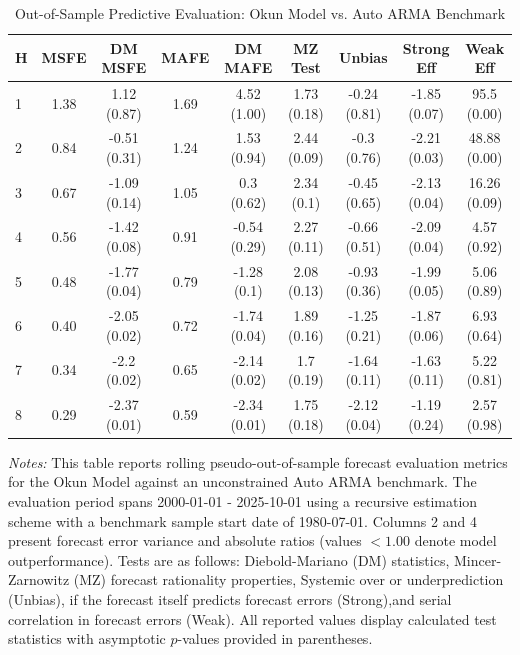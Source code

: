 \begin{table}[htbp]
\centering
\caption{Out-of-Sample Predictive Evaluation: Okun Model vs. Auto ARMA Benchmark}
\label{tab:okun_model_evaluation}
\footnotesize
\begin{tabular}{l cccccccc}
\hline\hline
\rule{0pt}{3ex}
\textbf{H} & \textbf{MSFE} & \textbf{DM MSFE} & \textbf{MAFE} & \textbf{DM MAFE} & \textbf{MZ Test} & \textbf{Unbias} & \textbf{Strong Eff} & \textbf{Weak Eff} \\[0.5ex]
\hline
\rule{0pt}{2.5ex}
1 & 1.38 & 1.12 (0.87) & 1.69 & 4.52 (1.00) & 1.73 (0.18) & -0.24 (0.81) & -1.85 (0.07) & 95.5 (0.00) \\
2 & 0.84 & -0.51 (0.31) & 1.24 & 1.53 (0.94) & 2.44 (0.09) & -0.3 (0.76) & -2.21 (0.03) & 48.88 (0.00) \\
3 & 0.67 & -1.09 (0.14) & 1.05 & 0.3 (0.62) & 2.34 (0.1) & -0.45 (0.65) & -2.13 (0.04) & 16.26 (0.09) \\
4 & 0.56 & -1.42 (0.08) & 0.91 & -0.54 (0.29) & 2.27 (0.11) & -0.66 (0.51) & -2.09 (0.04) & 4.57 (0.92) \\
5 & 0.48 & -1.77 (0.04) & 0.79 & -1.28 (0.1) & 2.08 (0.13) & -0.93 (0.36) & -1.99 (0.05) & 5.06 (0.89) \\
6 & 0.40 & -2.05 (0.02) & 0.72 & -1.74 (0.04) & 1.89 (0.16) & -1.25 (0.21) & -1.87 (0.06) & 6.93 (0.64) \\
7 & 0.34 & -2.2 (0.02) & 0.65 & -2.14 (0.02) & 1.7 (0.19) & -1.64 (0.11) & -1.63 (0.11) & 5.22 (0.81) \\
8 & 0.29 & -2.37 (0.01) & 0.59 & -2.34 (0.01) & 1.75 (0.18) & -2.12 (0.04) & -1.19 (0.24) & 2.57 (0.98) \\
\hline\hline
\end{tabular}%
\par\smallskip
\parbox{\textwidth}{\scriptsize \textit{Notes:} This table reports rolling pseudo-out-of-sample forecast evaluation metrics for the Okun Model against an unconstrained Auto ARMA benchmark. The evaluation period spans 2000-01-01 - 2025-10-01 using a recursive estimation scheme with a benchmark sample start date of 1980-07-01. Columns 2 and 4 present forecast error variance and absolute ratios (values $< 1.00$ denote model outperformance). Tests are as follows: Diebold-Mariano (DM) statistics, Mincer-Zarnowitz (MZ) forecast rationality properties, Systemic over or underprediction (Unbias), if the forecast itself predicts forecast errors (Strong),and serial correlation in forecast errors (Weak). All reported values display calculated test statistics with asymptotic $p$-values provided in parentheses.}
\end{table}
